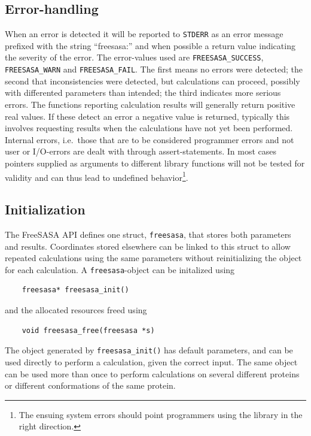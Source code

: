 \documentclass[a4paper,11pt]{article}
\begin{document}
\subsection{Error-handling}

When an error is detected it will be reported to \verb|STDERR| as an error
message prefixed with the string ``freesasa:'' and when possible a
return value indicating the severity of the error. The error-values
used are \verb|FREESASA_SUCCESS|, \verb|FREESASA_WARN| and
\verb|FREESASA_FAIL|. The first means no errors were detected; the
second that inconsistencies were detected, but calculations can
proceed, possibly with differented parameters than intended; the third
indicates more serious errors. The functions reporting calculation
results will generally return positive real values. If these detect an
error a negative value is returned, typically this involves requesting
results when the calculations have not yet been performed.  Internal
errors, i.e.\ those that are to be considered programmer errors and
not user or I/O-errors are dealt with through assert-statements. In
most cases pointers supplied as arguments to different library
functions will not be tested for validity and can thus lead to
undefined behavior\footnote{The ensuing system errors should point
  programmers using the library in the right direction.}.

\subsection{Initialization}

The FreeSASA API defines one struct, \verb|freesasa|, that stores both
parameters and results. Coordinates stored elsewhere can be linked to
this struct to allow repeated calculations using the same parameters
without reinitializing the object for each calculation. A
\verb|freesasa|-object can be initalized using
\begin{verbatim}
    freesasa* freesasa_init()
\end{verbatim}
and the allocated resources freed using
\begin{verbatim}
    void freesasa_free(freesasa *s)
\end{verbatim}
The object generated by \verb|freesasa_init()| has default parameters,
and can be used directly to perform a calculation, given the correct
input. The same object can be used more than once to perform
calculations on several different proteins or different conformations
of the same protein.
\end{document}
